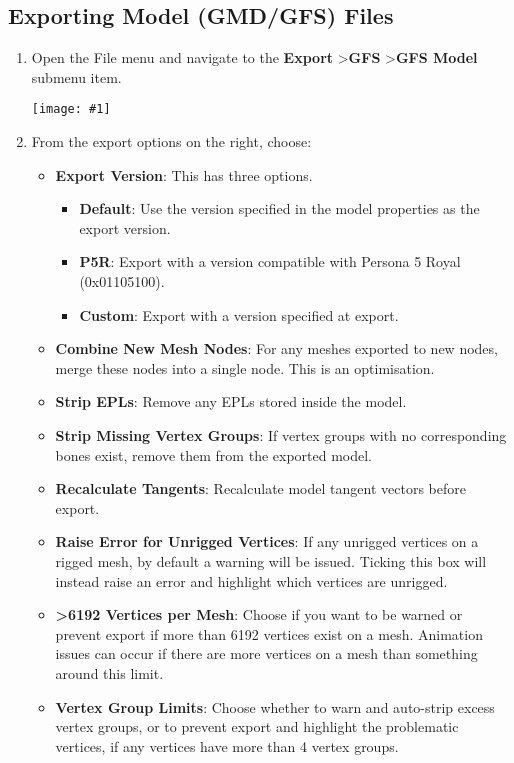 \documentclass{article}
\newenvironment{guide}[1]
{
	\begin{center}
		\begin{tcolorbox}[%
			colback=black!20, 
			boxrule=0pt, 
			title=Step-by-step: #1,
			enhanced,
			breakable,
			overlay unbroken={%
                \draw[line width=1pt, black, rounded corners]
        	    (frame.north west) rectangle (frame.south east);
			},
    		overlay first={%
        		 \draw[line width=1pt, black, rounded corners]
        	    (frame.south west) -- (frame.north west) -- (frame.north east) -- (frame.south east);
                \draw[line width=1pt, black]
                (frame.south west) -- (frame.south east);
            },
    		overlay middle={%
                \draw[line width=1pt, black]
        	    (frame.north west) rectangle (frame.south east);
        	},
    		overlay last={%
                \draw[line width=1pt, black, rounded corners]
        	    (frame.north west) -- (frame.south west) -- (frame.south east) -- (frame.north east);
                \draw[line width=1pt, black]
                (frame.north west) -- (frame.north east);
           	}
        ]{}
    	\begin{enumerate}
}
{
    		\end{enumerate}
    	\end{tcolorbox}
	\end{center}  	 
}
\newcommand{\guideimage}[1]
{
	\begin{center}
		\texttt{[image: \#1]}
	\end{center}
}
\begin{document}
\subsection{Exporting Model (GMD/GFS) Files}
\label{SECTION::EXPORT::ExportingModels}
\begin{guide}{Accessing the Model Export Menu}
\item Open the File menu and navigate to the \textbf{Export} \textgreater\space \textbf{GFS} \textgreater\space \textbf{GFS Model} submenu item.
\guideimage{images/export/export_gmd.png}
\item From the export options on the right, choose:
\begin{itemize}
\item \textbf{Export Version}: This has three options.
\begin{itemize}
\item \textbf{Default}: Use the version specified in the model properties as the export version.
\item \textbf{P5R}: Export with a version compatible with Persona 5 Royal (0x01105100).
\item \textbf{Custom}: Export with a version specified at export.
\end{itemize}
\item \textbf{Combine New Mesh Nodes}: For any meshes exported to new nodes, merge these nodes into a single node. This is an optimisation.
\item \textbf{Strip EPLs}: Remove any EPLs stored inside the model.
\item \textbf{Strip Missing Vertex Groups}: If vertex groups with no corresponding bones exist, remove them from the exported model.
\item \textbf{Recalculate Tangents}: Recalculate model tangent vectors before export.
\item \textbf{Raise Error for Unrigged Vertices}: If any unrigged vertices on a rigged mesh, by default a warning will be issued. Ticking this box will instead raise an error and highlight which vertices are unrigged.
\item \textbf{>6192 Vertices per Mesh}: Choose if you want to be warned or prevent export if more than 6192 vertices exist on a mesh. Animation issues can occur if there are more vertices on a mesh than something around this limit.
\item \textbf{Vertex Group Limits}: Choose whether to warn and auto-strip excess vertex groups, or to prevent export and highlight the problematic vertices, if any vertices have more than 4 vertex groups.

\end{itemize}
\end{guide}
\end{document}
